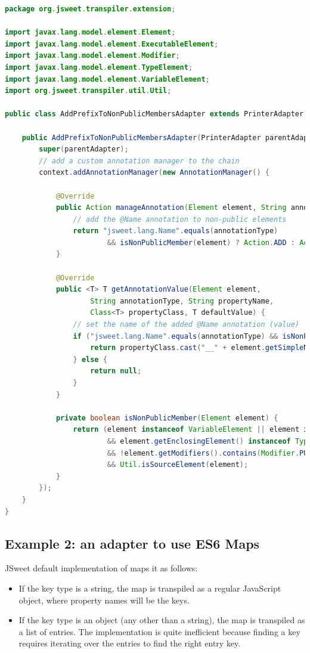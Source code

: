 \documentclass[a4paper]{report}
\begin{document}
\begin{lstlisting}[language=Java]
package org.jsweet.transpiler.extension;

import javax.lang.model.element.Element;
import javax.lang.model.element.ExecutableElement;
import javax.lang.model.element.Modifier;
import javax.lang.model.element.TypeElement;
import javax.lang.model.element.VariableElement;
import org.jsweet.transpiler.util.Util;

public class AddPrefixToNonPublicMembersAdapter extends PrinterAdapter {

	public AddPrefixToNonPublicMembersAdapter(PrinterAdapter parentAdapter) {
		super(parentAdapter);
		// add a custom annotation manager to the chain
		context.addAnnotationManager(new AnnotationManager() {

			@Override
			public Action manageAnnotation(Element element, String annotationType) {
				// add the @Name annotation to non-public elements			
				return "jsweet.lang.Name".equals(annotationType) 
						&& isNonPublicMember(element) ? Action.ADD : Action.VOID;
			}

			@Override
			public <T> T getAnnotationValue(Element element, 
					String annotationType, String propertyName,
					Class<T> propertyClass, T defaultValue) {
				// set the name of the added @Name annotation (value)
				if ("jsweet.lang.Name".equals(annotationType) && isNonPublicMember(element)) {
					return propertyClass.cast("__" + element.getSimpleName());
				} else {
					return null;
				}
			}

			private boolean isNonPublicMember(Element element) {
				return (element instanceof VariableElement || element instanceof ExecutableElement)
						&& element.getEnclosingElement() instanceof TypeElement
						&& !element.getModifiers().contains(Modifier.PUBLIC) 
						&& Util.isSourceElement(element);
			}
		});
	}
}
\end{lstlisting}

\subsection{Example 2: an adapter to use ES6 Maps}

JSweet default implementation of maps it as follows:

\begin{itemize}
\item If the key type is a string, the map is transpiled as a regular JavaScript object, where property names will be the keys.
\item If the key type is an object (any other than a string), the map is transpiled as a list of entries.  The implementation is quite inefficient because finding a key requires iterating over the entries to find the right entry key.
\end{itemize}
\end{document}
